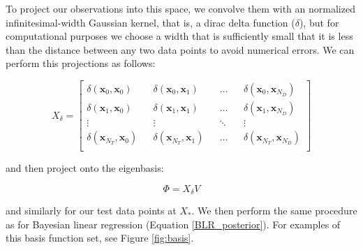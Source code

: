 \documentclass{article}
\begin{document}
To project our observations into this space, we convolve them with an normalized infinitesimal-width Gaussian kernel, that is, a dirac delta function ($\delta$), but for computational purposes we choose a width that is sufficiently small that it is less than the distance between any two data points to avoid numerical errors. We can perform this projections as follows: 

\begin{equation}
    X_\delta =
    \begin{bmatrix}
    \delta(\mathbf{x}_0,\mathbf{x}_0) && \delta(\mathbf{x}_0,\mathbf{x}_1) && \dots && \delta(\mathbf{x}_0,\mathbf{x}_{N_D}) \\
    \delta(\mathbf{x}_1,\mathbf{x}_0) && \delta(\mathbf{x}_1,\mathbf{x}_1) && \dots && \delta(\mathbf{x}_1,\mathbf{x}_{N_D}) \\
    \vdots && \vdots && \ddots && \vdots \\
    \delta(\mathbf{x}_{N_T},\mathbf{x}_0) && \delta(\mathbf{x}_{N_T},\mathbf{x}_1) && \dots && \delta(\mathbf{x}_{N_T},\mathbf{x}_{N_D}) \\
    \end{bmatrix}
\end{equation}

and then project onto the eigenbasis:

\begin{equation}
    \Phi = X_\delta V
\end{equation}

and similarly for our test data points at $X_\ast$. We then perform the same procedure as for Bayesian linear regression (Equation \ref{BLR_posterior}). For examples of this basis function set, see Figure \ref{fig:basis}.
\end{document}
